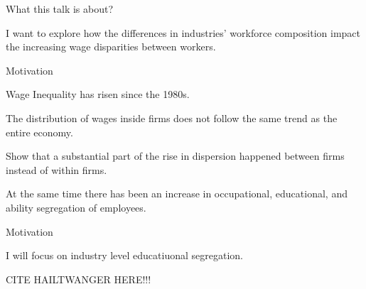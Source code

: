 \documentclass[notes,11pt, aspectratio=169]{beamer}
\newenvironment{transitionframe}{
  \setbeamercolor{background canvas}{bg=yellow}
  \begin{frame}}{
    \end{frame}
}
\newenvironment{wideitemize}{\itemize\addtolength{\itemsep}{10pt}}{\enditemize}
\begin{document}
\begin{frame}{What this talk is about?}
    \begin{wideitemize}
        \item I want to explore how the differences in industries' workforce composition impact the increasing wage disparities between workers.
    \end{wideitemize}
\end{frame}
\begin{frame}{Motivation}
\begin{wideitemize}
    \item Wage Inequality has risen since the 1980s.
    \item The distribution of wages inside firms does not follow the same trend as the entire economy.
    \item \cite{song2019firming} Show that a substantial part of the rise in dispersion happened between firms instead of within firms.
    \item At the same time there has been an increase in occupational, educational, and ability segregation of employees.
\end{wideitemize}
\end{frame}
\begin{frame}{Motivation}
\begin{wideitemize}
    \item I will focus on industry level educatiuonal segregation.
    \item CITE HAILTWANGER HERE!!!
\end{wideitemize}
\end{frame}
\end{document}
